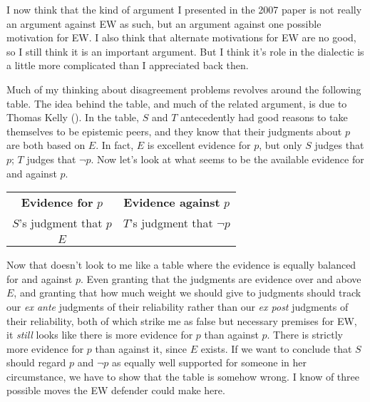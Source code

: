 \documentclass[
  11pt,
  letterpaper,
  DIV=11,
  numbers=noendperiod,
  oneside]{scrartcl}
\begin{document}
I now think that the kind of argument I presented in the 2007 paper is
not really an argument against EW as such, but an argument against one
possible motivation for EW. I also think that alternate motivations for
EW are no good, so I still think it is an important argument. But I
think it's role in the dialectic is a little more complicated than I
appreciated back then.

Much of my thinking about disagreement problems revolves around the
following table. The idea behind the table, and much of the related
argument, is due to Thomas Kelly
(). In the table, \(S\) and \(T\)
antecedently had good reasons to take themselves to be epistemic peers,
and they know that their judgments about \(p\) are both based on \(E\).
In fact, \(E\) is excellent evidence for \(p\), but only \(S\) judges
that \(p\); \(T\) judges that \(\neg p\). Now let's look at what seems
to be the available evidence for and against \(p\).

\begin{longtable}[]{@{}cc@{}}
\toprule\noalign{}
\endhead
\bottomrule\noalign{}
\endlastfoot
\textbf{Evidence for} \(p\) & \textbf{Evidence against} \(p\) \\
\(S\)'s judgment that \(p\) & \(T\)'s judgment that \(\neg p\) \\
\(E\) & \\
\end{longtable}

Now that doesn't look to me like a table where the evidence is equally
balanced for and against \(p\). Even granting that the judgments are
evidence over and above \(E\), and granting that how much weight we
should give to judgments should track our \emph{ex ante} judgments of
their reliability rather than our \emph{ex post} judgments of their
reliability, both of which strike me as false but necessary premises for
EW, it \emph{still} looks like there is more evidence for \(p\) than
against \(p\). There is strictly more evidence for \(p\) than
against it, since \(E\) exists. If we want to conclude that \(S\) should
regard \(p\) and \(\neg p\) as equally well supported for someone in her
circumstance, we have to show that the table is somehow wrong. I know of
three possible moves the EW defender could make here.
\end{document}
